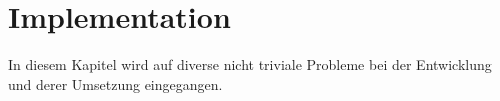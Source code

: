 \section{Implementation}
In diesem Kapitel wird auf diverse nicht triviale Probleme bei der Entwicklung und derer Umsetzung eingegangen. \\



